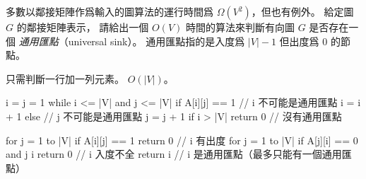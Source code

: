 \startEXERCISE
多數以鄰接矩陣作爲輸入的圖算法的運行時間爲 $\Omega(V^2)$，但也有例外。
給定圖 $G$ 的鄰接矩陣表示，
請給出一個 $O(V)$ 時間的算法來判斷有向圖 $G$ 是否存在一個 \emph{通用匯點}（universal sink）。
通用匯點指的是入度爲 $|V|-1$ 但出度爲 0 的節點。
\stopEXERCISE

\startANSWER
只需判斷一行加一列元素。 $O(|V|)$。

\startCLRSCODE
i = j = 1
while i <= |V| and j <= |V|
	if A[i][j] == 1		// i 不可能是通用匯點
		i = i + 1
	else			// j 不可能是通用匯點
		j = j + 1
if i > |V|
	return 0		// 沒有通用匯點

for j = 1 to |V|
	if A[i][j] == 1
		return 0	// i 有出度
for j = 1 to |V|
	if A[j][i] == 0 and j \ne i
		return 0	// i 入度不全
return i			// i 是通用匯點（最多只能有一個通用匯點）
\stopCLRSCODE
\stopANSWER
